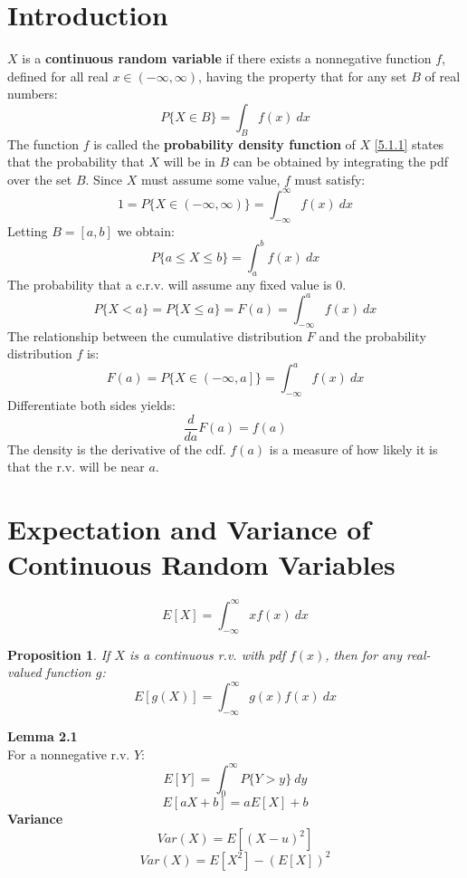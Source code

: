 \documentclass[openany]{book}
\numberwithin{equation}{section}
\newtheorem{proposition}{Proposition}[section]
\begin{document}
\begin{flushleft}
\section{Introduction}
$X$ is a \textbf{continuous random variable} if there exists a nonnegative function $f$, defined for all real $x \in (-\infty,\infty)$, having the property that for any set $B$ of real numbers:
\begin{equation}
\label{5.1.1}
P\{X \in B\}= \int_{B}f(x) \ dx
\end{equation}
The function $f$ is called the \textbf{probability density function} of $X$ \medbreak
\eqref{5.1.1} states that the probability that $X$ will be in $B$ can be obtained by integrating the pdf over the set $B$. Since $X$ must assume some value, $f$ must satisfy:
\[1=P\{X \in (-\infty,\infty) \}= \int_{-\infty}^{\infty}f(x) \ dx
\]
Letting $B=\left[a,b\right]$ we obtain:
\begin{equation}
\label{5.1.2}
P\{a\leq X \leq b \}= \int_{a}^{b}f(x)\ dx
\end{equation}
The probability that a c.r.v. will assume any fixed value is 0. \medbreak
\[P\{X<a\}=P\{X\leq a\}=F(a)=\int_{-\infty}^{a}f(x) \ dx
\]
The relationship between the cumulative distribution $F$ and the probability distribution $f$ is:
\[F(a)=P\{X \in \left(-\infty,a \right] \} = \int_{-\infty}^{a}f(x) \ dx
\]
Differentiate both sides yields:
\[\frac{d}{da}F(a)=f(a)
\]
The density is the derivative of the cdf. \medbreak
$f(a)$ is a measure of how likely it is that the r.v. will be near $a$.
\section{Expectation and Variance of Continuous Random Variables}
\[E[X]=\int_{-\infty}^{\infty}xf(x) \ dx
\]
\begin{proposition}
	\label{p5.2.1}
	If $X$ is a continuous r.v. with pdf $f(x)$, then for any real-valued function $g$:
	\[E[g(X)]=\int_{-\infty}^{\infty}g(x)f(x) \ dx
	\]
	
\end{proposition}
\textbf{Lemma 2.1}\\
For a nonnegative r.v. $Y$:
\[E[Y]=\int_{0}^{\infty}P\{Y>y \} \ dy
\]
\[E[aX+b]=aE[X]+b
\]
\textbf{Variance}
\[Var(X)=E[(X-u)^2]\] 
\[Var(X)=E[X^2]-(E[X])^2
\]

\end{flushleft}
\end{document}
